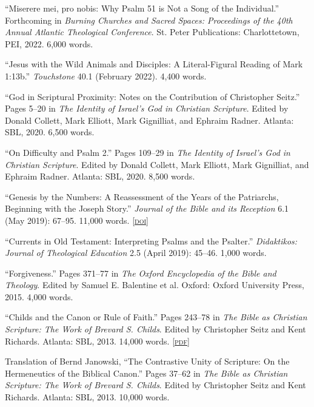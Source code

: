 \documentclass[11pt]{article}
\newcommand{\pdf}[1]{\href{#1}{\footnotesize\textsc{[pdf]}}}
\newcommand{\doi}[1]{\href{https://doi.org/#1}{\footnotesize\textsc{[doi]}}}
\newcommand{\years}[1]{\marginnote{\footnotesize #1}}
\begin{document}
\years{2022}
``Miserere mei, pro nobis: Why Psalm 51 is Not a Song of the Individual.'' Forthcoming in \emph{Burning Churches and Sacred Spaces: Proceedings of the 40th Annual Atlantic Theological Conference}. St. Peter Publications: Charlottetown, PEI, 2022. 6,000 words.

\years{2022}
``Jesus with the Wild Animals and Disciples: A Literal-Figural Reading of Mark 1:13b.'' \emph{Touchstone} 40.1 (February 2022). 4,400 words.

\years{2020}
``God in Scriptural Proximity: Notes on the Contribution of Christopher
Seitz.'' Pages 5--20 in \emph{The Identity of Israel’s God in Christian
Scripture}. Edited by Donald Collett, Mark Elliott, Mark Gignilliat, and
Ephraim Radner. Atlanta: SBL, 2020. 6,500 words.%

\years{2020}
``On Difficulty and Psalm 2.'' Pages 109--29 in \emph{The Identity of
Israel’s God in Christian Scripture}. Edited by Donald Collett, Mark
Elliott, Mark Gignilliat, and Ephraim Radner. Atlanta: SBL, 2020. 8,500 words.%

\years{2019}
``Genesis by the Numbers: A Reassessment of the Years of the Patriarchs,
Beginning with the Joseph Story.'' \emph{Journal of the Bible and its
Reception} 6.1 (May 2019): 67–95. 11,000 words.
\doi{10.1515/jbr-2019-1003}

\years{2019}
``Currents in Old Testament: Interpreting Psalms and the Psalter.''
\emph{Didaktikos: Journal of Theological Education} 2.5 (April 2019):
45–46. 1,000 words.%

\years{2015}
``Forgiveness.'' Pages 371--77 in \emph{The Oxford Encyclopedia of the
Bible and Theology}. Edited by Samuel E. Balentine et al. Oxford: Oxford
University Press, 2015. 4,000 words.

\years{2013}
``Childs and the Canon or Rule of Faith.'' Pages 243--78 in \emph{The
Bible as Christian Scripture: The Work of Brevard S. Childs}. Edited by
Christopher Seitz and Kent Richards. Atlanta: SBL, 2013. 14,000 words.
\pdf{http://danieldriver.com/assets/pdf/publications/Driver_2013.pdf}

\years{2013}
Translation of Bernd Janowski, ``The Contrastive Unity of Scripture: On
the Hermeneutics of the Biblical Canon.'' Pages 37--62 in \emph{The
Bible as Christian Scripture: The Work of Brevard S. Childs}. Edited by
Christopher Seitz and Kent Richards. Atlanta: SBL, 2013. 10,000 words.
\end{document}
